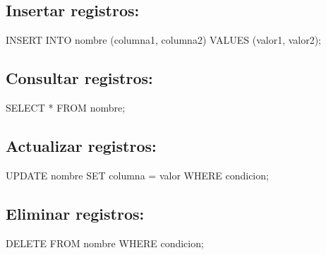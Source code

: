 \documentclass[
  a4paper,
  onepage,
  openany]{scrreprt}
\newenvironment{Shaded}{\begin{snugshade}}{\end{snugshade}}
\newcommand{\KeywordTok}[1]{\textcolor[rgb]{0.00,0.23,0.31}{#1}}
\newcommand{\NormalTok}[1]{\textcolor[rgb]{0.00,0.23,0.31}{#1}}
\newcommand{\OperatorTok}[1]{\textcolor[rgb]{0.37,0.37,0.37}{#1}}
\begin{document}
\hypertarget{insertar-registros-3}{%
\subsection{Insertar registros:}\label{insertar-registros-3}}

\begin{Shaded}
\begin{Highlighting}[]
\KeywordTok{INSERT} \KeywordTok{INTO}\NormalTok{ nombre (columna1, columna2) }\KeywordTok{VALUES}\NormalTok{ (valor1, valor2);}
\end{Highlighting}
\end{Shaded}

\hypertarget{consultar-registros-3}{%
\subsection{Consultar registros:}\label{consultar-registros-3}}

\begin{Shaded}
\begin{Highlighting}[]
\KeywordTok{SELECT} \OperatorTok{*} \KeywordTok{FROM}\NormalTok{ nombre;}
\end{Highlighting}
\end{Shaded}

\hypertarget{actualizar-registros-3}{%
\subsection{Actualizar registros:}\label{actualizar-registros-3}}

\begin{Shaded}
\begin{Highlighting}[]
\KeywordTok{UPDATE}\NormalTok{ nombre }\KeywordTok{SET}\NormalTok{ columna }\OperatorTok{=}\NormalTok{ valor }\KeywordTok{WHERE}\NormalTok{ condicion;}
\end{Highlighting}
\end{Shaded}

\hypertarget{eliminar-registros-3}{%
\subsection{Eliminar registros:}\label{eliminar-registros-3}}

\begin{Shaded}
\begin{Highlighting}[]
\KeywordTok{DELETE} \KeywordTok{FROM}\NormalTok{ nombre }\KeywordTok{WHERE}\NormalTok{ condicion;}
\end{Highlighting}
\end{Shaded}
\end{document}
